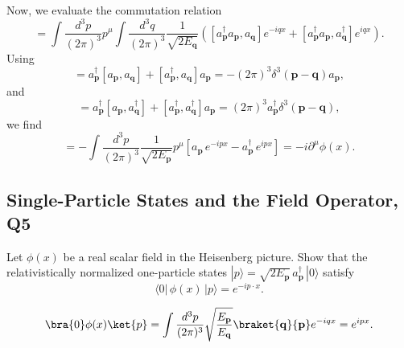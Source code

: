 \begin{solution}
    Now, we evaluate the commutation relation
    \begin{equation}
        [P^\mu,\phi(x)] = \int\frac{d^3p}{(2\pi)^3}p^\mu \int\frac{d^3q}{(2\pi)^3}\frac{1}{\sqrt{2E_\mathbf{q}}}\left([a_\mathbf{p}^\dagger a_\mathbf{p},a_\mathbf{q}]e^{-iqx} + [a_\mathbf{p}^\dagger a_\mathbf{p},a_\mathbf{q}^\dagger]e^{iqx}\right).
    \end{equation}
    Using
    \begin{equation}
        [a_\mathbf{p}^\dagger a_\mathbf{p},a_\mathbf{q}] = a_\mathbf{p}^\dagger[ a_\mathbf{p},a_\mathbf{q}] + [ a_\mathbf{p}^\dagger,a_\mathbf{q}]a_\mathbf{p} = -(2\pi)^3\delta^3(\mathbf{p}-\mathbf{q})a_\mathbf{p},
    \end{equation}
    and
    \begin{equation}
        [a_\mathbf{p}^\dagger a_\mathbf{p},a_\mathbf{q}^\dagger] = a_\mathbf{p}^\dagger[ a_\mathbf{p},a_\mathbf{q}^\dagger] + [a_\mathbf{p}^\dagger ,a_\mathbf{q}^\dagger]a_\mathbf{p} = (2\pi)^3a_\mathbf{p}^\dagger\delta^3(\mathbf{p}-\mathbf{q}),
    \end{equation}
    we find
    \begin{equation}
        [P^\mu,\phi(x)] = -\int\frac{d^3p}{(2\pi)^3}\frac{1}{\sqrt{2E_\mathbf{p}}}p^\mu\left[a_{\mathbf{p}}\,e^{-ipx} - a_{\mathbf{p}}^\dagger\,e^{ipx}\right] = -i\partial^\mu\phi(x).
    \end{equation}
\end{solution}

\subsection{Single-Particle States and the Field Operator, Q5}

Let $\phi(x)$ be a real scalar field in the Heisenberg picture. Show that the relativistically normalized one-particle states $|p\rangle = \sqrt{2E_{\mathbf{p}}}\,a_{\mathbf{p}}^\dagger\,|0\rangle$ satisfy
\begin{equation}
    \langle 0|\,\phi(x)\,|p\rangle = e^{-ip\cdot x}.
\end{equation}
\begin{solution}
    \begin{equation}
        \bra{0}\phi(x)\ket{p} = \int\frac{d^3p}{(2\pi)^3}\sqrt{\frac{E_\mathbf{p}}{E_\mathbf{q}}}\braket{\mathbf{q}}{\mathbf{p}}e^{-iqx} = e^{ipx}.
    \end{equation}
    
\end{solution}


